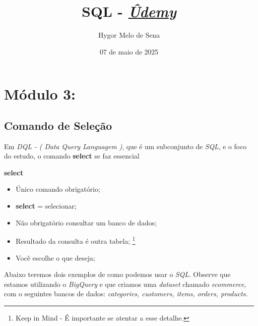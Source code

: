 \documentclass[a4paper]{article}
\title{SQL - \textit{\textbf{\href{https://www.udemy.com/course/curso-completo-sql-para-analise-de-dados/}{Ûdemy}}}}
\author{Hygor Melo de Sena}
\date{07 de maio de 2025}
\begin{document}
    \maketitle
        
        \newpage
        
    \tableofcontents
        
        \newpage
    
    \section{Módulo 3:}
    
    
           
    
    
        \subsection{Comando de Seleção}
            
            Em \textit{DQL - ( Data Query Languagem )}, que é um subconjunto de \textit{SQL}, e o foco do estudo, o comando \textbf{select} se faz essencial
            
            \bigskip
            
            \textbf{select}
            
                \begin{itemize}
                    \item Único comando obrigatório;
                    \item \textbf{select} = selecionar;
                    \item Não obrigatório consultar um banco de dados;
                    \item Resultado da consulta é outra tabela; \footnote{Keep in Mind - É importante se atentar a esse detalhe.}
                    \item Você escolhe o que deseja;
                \end{itemize}
            
            \bigskip
            
            \noindent Abaixo teremos dois exemplos de como podemos usar o \textit{SQL}. Observe que estamos utilizando o \textit{BigQuery} e que criamos uma \textit{dataset} chamado \textit{ecommerce}, com o seguintes bancos de dados: \textit{categories, customers, items, orders, products.}
            
\end{document}
